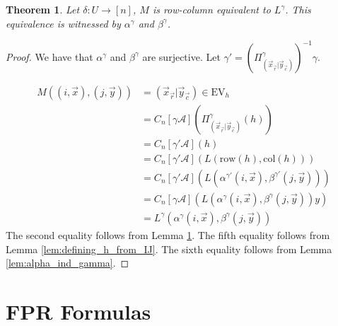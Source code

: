 \documentclass[12pt]{report}
\newtheorem{thm}{Theorem} \newtheorem{claim}[thm]{Claim}
\newcommand{\row}{\text{row}}
\newcommand{\column}{\text{col}}
\newcommand{\EV}{\text{EV}}
\begin{document}
\begin{thm}
  Let $\delta: U \rightarrow [n]$, $M$ is row-column equivalent to $L^{\gamma}$.
  This equivalence is witnessed by $\alpha^{\gamma}$ and $\beta^{\gamma}$.
\end{thm}
\begin{proof}
  We have that $\alpha^{\gamma}$ and $\beta^{\gamma}$ are surjective. Let
  $\gamma' = (\Pi^{\gamma}_{(\vec{x}_{\vec{r}} \vert \vec{y}_{\vec{c}})})^{-1}
  \gamma$.

  \begin{align*}
    M((i, \vec{x}), (j, \vec{y}))
    &= (\vec{x}_{\vec{r}} \vert \vec{y}_{\vec{c}}) \in \EV_h \\
    &= C_n[\gamma \mathcal{A}] (\Pi^{\gamma}_{(\vec{x}_{\vec{r}} \vert \vec{y}_{\vec{c}})} (h)) \\
    &= C_n[\gamma' \mathcal{A}] (h) \\
    &= C_n[\gamma' \mathcal{A}](L(\row(h), \column (h)))\\
    &= C_n[\gamma' \mathcal{A}](L(\alpha^{\gamma'}(i, \vec{x}), \beta^{\gamma'}(j, \vec{y})))\\
    &= C_n[\gamma \mathcal{A}](L(\alpha^{\gamma}(i, \vec{x}), \beta^{\gamma}(j, \vec{y}))y)\\
    &= L^{\gamma}(\alpha^{\gamma}(i, \vec{x}), \beta^{\gamma}(j, \vec{y}))
  \end{align*}
  The second equality follows from Lemma \ref{}. The fifth equality follows from
  Lemma \ref{lem:defining_h_from_IJ}. The sixth equality follows from Lemma
  \ref{lem:alpha_ind_gamma}.

  
\end{proof}

\section{FPR Formulas}
\end{document}
